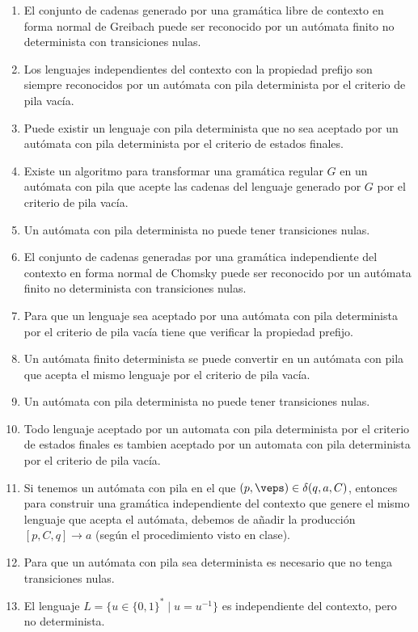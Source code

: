 \begin{enumerate}
    \item El conjunto de cadenas generado por una gramática libre de contexto en forma normal de Greibach puede ser reconocido por un autómata finito no determinista con transiciones nulas.
    \item Los lenguajes independientes del contexto con la propiedad prefijo son siempre reconocidos por un autómata con pila determinista por el criterio de pila vacía.
    \item Puede existir un lenguaje con pila determinista que no sea aceptado por un autómata con pila determinista por el criterio de estados finales.
    \item Existe un algoritmo para transformar una gramática regular $G$ en un autómata con pila que acepte las cadenas del lenguaje generado por $G$ por el criterio de pila vacía.
    \item Un autómata con pila determinista no puede tener transiciones nulas.
    \item El conjunto de cadenas generadas por una gramática independiente del contexto en forma normal de Chomsky puede ser reconocido por un autómata finito no determinista con transiciones nulas.
    \item Para que un lenguaje sea aceptado por una autómata con pila determinista por el criterio de pila vacía tiene que verificar la propiedad prefijo.
    \item Un autómata finito determinista se puede convertir en un autómata con pila que acepta el mismo lenguaje por el criterio de pila vacía.
    \item Un autómata con pila determinista no puede tener transiciones nulas.
    \item Todo lenguaje aceptado por un automata con pila determinista por el criterio de estados finales es tambien aceptado por un automata con pila determinista por el criterio de pila vacía.
    \item Si tenemos un autómata con pila en el que $(p,\veps)\in \delta(q,a,C)$, entonces para construir una gramática independiente del contexto que genere el mismo lenguaje que acepta el autómata, debemos de añadir la producción $[p,C,q]\rightarrow a$ (según el procedimiento visto en clase).
    \item Para que un autómata con pila sea determinista es necesario que no tenga transiciones nulas.
    \item El lenguaje $L = \{u\in {\{0,1\}}^{\ast} \mid u = u^{-1}\}$ es independiente del contexto, pero no determinista.
\end{enumerate}
